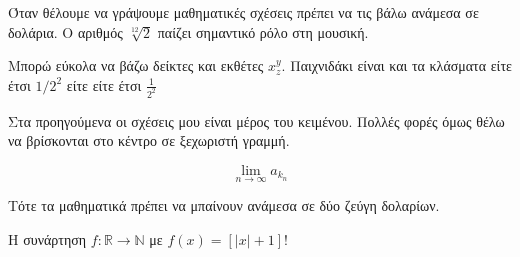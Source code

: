 \documentclass[11pt,a4paper]{article}
\begin{document}
Όταν θέλουμε να γράψουμε μαθηματικές σχέσεις πρέπει να τις βάλω ανάμεσα σε δολάρια. Ο αριθμός $\sqrt[12]{2}$ παίζει σημαντικό ρόλο στη μουσική.


Μπορώ εύκολα να βάζω δείκτες και εκθέτες $x^y_z$. Παιχνιδάκι είναι και τα κλάσματα είτε έτσι $1/2^2$ είτε είτε έτσι $\frac{1}{2^2}$


Στα προηγούμενα οι σχέσεις μου είναι μέρος του κειμένου. Πολλές φορές όμως θέλω να βρίσκονται στο κέντρο σε ξεχωριστή γραμμή.

$$\lim_{n\to\infty}{a_{k_n}}$$


Τότε τα μαθηματικά πρέπει να μπαίνουν ανάμεσα σε δύο ζεύγη δολαρίων.


Η συνάρτηση $f:\mathbb{R}\rightarrow\mathbb{N}$ με $f(x)=[|x|+1]!$
\end{document}
